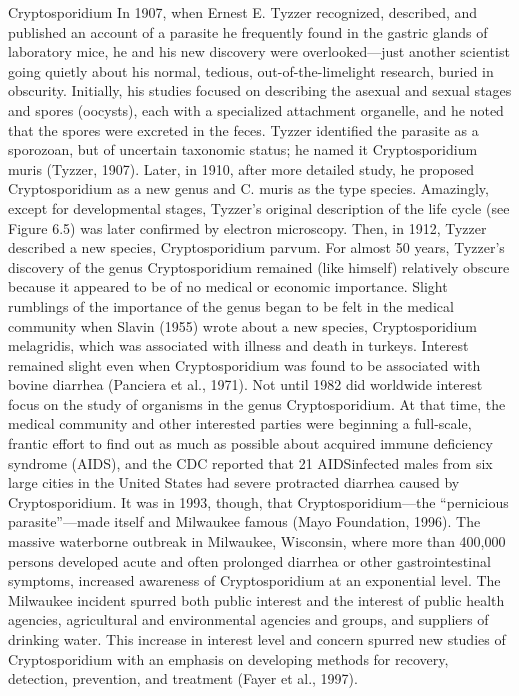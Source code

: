 \documentclass{article}
\begin{document}
Cryptosporidium In 1907, when Ernest E. Tyzzer recognized, described,
and published an account of a parasite he frequently found in the
gastric glands of laboratory mice, he and his new discovery were
overlooked---just another scientist going quietly about his normal,
tedious, out-of-the-limelight research, buried in obscurity. Initially,
his studies focused on describing the asexual and sexual stages and
spores (oocysts), each with a specialized attachment organelle, and he
noted that the spores were excreted in the feces. Tyzzer identified the
parasite as a sporozoan, but of uncertain taxonomic status; he named it
Cryptosporidium muris (Tyzzer, 1907). Later, in 1910, after more
detailed study, he proposed Cryptosporidium as a new genus and C. muris
as the type species. Amazingly, except for developmental stages,
Tyzzer's original description of the life cycle (see Figure 6.5) was
later confirmed by electron microscopy. Then, in 1912, Tyzzer described
a new species, Cryptosporidium parvum. For almost 50 years, Tyzzer's
discovery of the genus Cryptosporidium remained (like himself)
relatively obscure because it appeared to be of no medical or economic
importance. Slight rumblings of the importance of the genus began to be
felt in the medical community when Slavin (1955) wrote about a new
species, Cryptosporidium melagridis, which was associated with illness
and death in turkeys. Interest remained slight even when Cryptosporidium
was found to be associated with bovine diarrhea (Panciera et al., 1971).
Not until 1982 did worldwide interest focus on the study of organisms in
the genus Cryptosporidium. At that time, the medical community and other
interested parties were beginning a full-scale, frantic effort to find
out as much as possible about acquired immune deficiency syndrome
(AIDS), and the CDC reported that 21 AIDSinfected males from six large
cities in the United States had severe protracted diarrhea caused by
Cryptosporidium. It was in 1993, though, that Cryptosporidium---the
``pernicious parasite''---made itself and Milwaukee famous (Mayo
Foundation, 1996). The massive waterborne outbreak in Milwaukee,
Wisconsin, where more than 400,000 persons developed acute and often
prolonged diarrhea or other gastrointestinal symptoms, increased
awareness of Cryptosporidium at an exponential level. The Milwaukee
incident spurred both public interest and the interest of public health
agencies, agricultural and environmental agencies and groups, and
suppliers of drinking water. This increase in interest level and concern
spurred new studies of Cryptosporidium with an emphasis on developing
methods for recovery, detection, prevention, and treatment (Fayer et
al., 1997).
\end{document}
